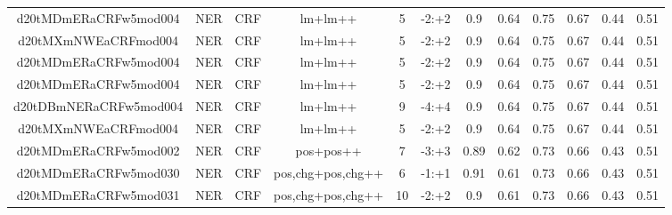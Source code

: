 \documentclass[a4paper]{article}
\begin{document}
\begin{landscape}
\begin{center}
\begin{tabular}{ |c|c|c|c|c|c|c|c|c|c|c|c|}
 	
 
 	
 		
 		\small{ d20tMDmERaCRFw5mod004 } & NER & CRF & lm+lm++  &  5 &  -2:+2  &  0.9 & 0.64 & 0.75  &  0.67 & 0.44 & 0.51 \\
 		

 	
 
 	
 		
 		\small{ d20tMXmNWEaCRFmod004 } & NER & CRF & lm+lm++  &  5 &  -2:+2  &  0.9 & 0.64 & 0.75  &  0.67 & 0.44 & 0.51 \\
 		

 	
 
 	
 		
 		\small{ d20tMDmERaCRFw5mod004 } & NER & CRF & lm+lm++  &  5 &  -2:+2  &  0.9 & 0.64 & 0.75  &  0.67 & 0.44 & 0.51 \\
 		

 	
 
 	
 		
 		\small{ d20tMDmERaCRFw5mod004 } & NER & CRF & lm+lm++  &  5 &  -2:+2  &  0.9 & 0.64 & 0.75  &  0.67 & 0.44 & 0.51 \\
 		

 	
 
 	
 		
 		\small{ d20tDBmNERaCRFw5mod004 } & NER & CRF & lm+lm++  &  9 &  -4:+4  &  0.9 & 0.64 & 0.75  &  0.67 & 0.44 & 0.51 \\
 		

 	
 
 	
 		
 		\small{ d20tMXmNWEaCRFmod004 } & NER & CRF & lm+lm++  &  5 &  -2:+2  &  0.9 & 0.64 & 0.75  &  0.67 & 0.44 & 0.51 \\
 		

 	
 
 	
 		
 		\small{ d20tMDmERaCRFw5mod002 } & NER & CRF & pos+pos++  &  7 &  -3:+3  &  0.89 & 0.62 & 0.73  &  0.66 & 0.43 & 0.51 \\
 		

 	
 
 	
 		
 		\small{ d20tMDmERaCRFw5mod030 } & NER & CRF & pos,chg+pos,chg++  &  6 &  -1:+1  &  0.91 & 0.61 & 0.73  &  0.66 & 0.43 & 0.51 \\
 		

 	
 
 	
 		
 		\small{ d20tMDmERaCRFw5mod031 } & NER & CRF & pos,chg+pos,chg++  &  10 &  -2:+2  &  0.9 & 0.61 & 0.73  &  0.66 & 0.43 & 0.51 \\
 		


\end{tabular}
\end{center}
\end{landscape}
\end{document}
